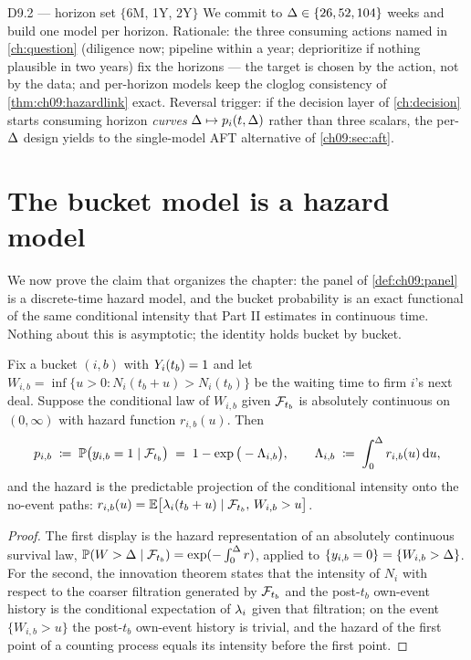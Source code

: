 \begin{decision}{D9.2 --- horizon set $\{$6M, 1Y, 2Y$\}$}
We commit to $\Delta \in \{26, 52, 104\}$ weeks and build one model per
horizon. Rationale: the three consuming actions named in
\cref{ch:question} (diligence now; pipeline within a year; deprioritize
if nothing plausible in two years) fix the horizons --- the target is
chosen by the action, not by the data; and per-horizon models keep the
cloglog consistency of \cref{thm:ch09:hazardlink} exact.
Reversal trigger: if the decision layer of \cref{ch:decision} starts
consuming horizon \emph{curves} $\Delta \mapsto p_i(t,\Delta)$
rather than three scalars, the per-$\Delta$ design yields to the
single-model AFT alternative of \cref{ch09:sec:aft}.
\end{decision}

\section{The bucket model is a hazard model}\label{ch09:sec:hazardlink}

We now prove the claim that organizes the chapter: the panel of
\cref{def:ch09:panel} is a discrete-time hazard model, and the bucket
probability is an exact functional of the same conditional intensity that
Part II estimates in continuous time. Nothing about this is asymptotic;
the identity holds bucket by bucket.

\begin{lemma}\label{lem:ch09:waiting}
Fix a bucket $(i,b)$ with $Y_i(t_b)=1$ and let
$W_{i,b} = \inf\{u > 0 : N_i(t_b+u) > N_i(t_b)\}$ be the waiting time to
firm $i$'s next deal. Suppose the conditional law of $W_{i,b}$ given
$\mathcal{F}_{t_b}$ is absolutely continuous on $(0,\infty)$ with hazard function
$r_{i,b}(u)$. Then
\begin{equation}\label{eq:ch09:hazardmass}
p_{i,b} \;\coloneqq\; \mathbb{P}\big( y_{i,b} = 1 \mid \mathcal{F}_{t_b} \big)
\;=\; 1 - \exp\big( -\Lambda_{i,b} \big),
\qquad
\Lambda_{i,b} \;\coloneqq\; \int_0^{\Delta} r_{i,b}(u) \,\mathrm{d} u ,
\end{equation}
and the hazard is the predictable projection of the conditional
intensity onto the no-event paths:
$r_{i,b}(u) = \mathbb{E}\big[ \lambda_i(t_b+u) \mid \mathcal{F}_{t_b},\, W_{i,b} > u \big]$.
\end{lemma}

\begin{proof}
The first display is the hazard representation of an absolutely
continuous survival law, $\mathbb{P}(W > \Delta \mid \mathcal{F}_{t_b}) =
\exp(-\int_0^{\Delta} r)$, applied to
$\{y_{i,b}=0\} = \{W_{i,b} > \Delta\}$. For the second, the innovation
theorem \citep[II.4.2]{abgk1993} states that the intensity of $N_i$ with
respect to the coarser filtration generated by $\mathcal{F}_{t_b}$ and the
post-$t_b$ own-event history is the conditional expectation of
$\lambda_i$ given that filtration; on the event $\{W_{i,b} > u\}$ the
post-$t_b$ own-event history is trivial, and the hazard of the first
point of a counting process equals its intensity before the first point.
\end{proof}

